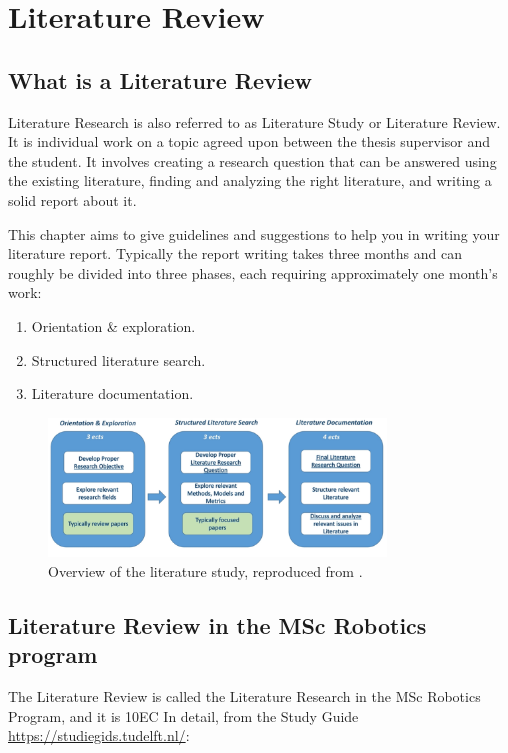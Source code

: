 \chapter{Literature Review}\label{c:literature}

\section{What is a Literature Review}
Literature Research is also referred to as Literature Study or Literature Review.
It is individual work on a topic agreed upon between the thesis supervisor and the student.
It involves creating a research question that can be answered using the existing literature, finding and analyzing the right literature, and writing a solid report about it.

This chapter aims to give guidelines and suggestions to help you in writing your literature report. Typically the report writing takes three months and can roughly be divided into three phases, each requiring approximately one month’s work:
\begin{enumerate}
    \item Orientation \& exploration.
    \item Structured literature search.
    \item Literature documentation.
\end{enumerate}

\begin{figure}[h!]
	\centering
	\includegraphics[width=0.8\textwidth]{figures/literatu_study_process.png}
	\caption{Overview of the literature study, reproduced from \cite{Master Thesis Guide, HRI section Cognitive Robotics}.}
	\label{fig:dexnet3_functionality}
\end{figure}

\section{Literature Review in the MSc Robotics program}
The Literature Review is called the Literature Research in the MSc Robotics Program, and it is 10EC
In detail, from the Study Guide \url{https://studiegids.tudelft.nl/}:

